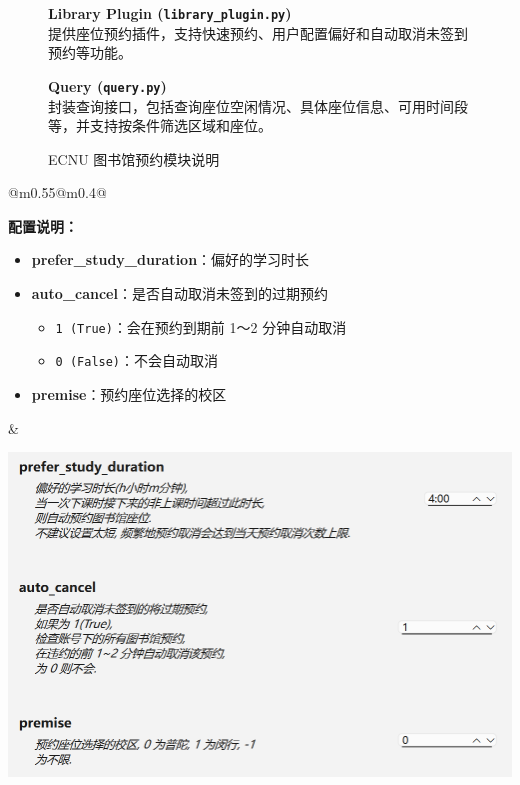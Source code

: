 \documentclass[14pt,a4paper,UTF8,twoside]{article}
\begin{document}
\begin{figure}[H]
{\begin{minipage}[H]{0.45\textwidth}
        \textbf{Library Plugin (\texttt{library\_plugin.py})}\\
        提供座位预约插件，支持快速预约、用户配置偏好和自动取消未签到预约等功能。\\
        \vspace{0.25cm}

        \textbf{Query (\texttt{query.py})}\\
        封装查询接口，包括查询座位空闲情况、具体座位信息、可用时间段等，并支持按条件筛选区域和座位。\\
    \end{minipage}
    }
    \caption{ECNU 图书馆预约模块说明}
    \label{fig:directory_structure}
\end{figure}

\newpage{}

\begin{table}[H]
    \centering
    \begin{tabular}{@{}m{0.55\textwidth}@{}m{0.4\textwidth}@{}}
        \begin{minipage}[H]{\linewidth}
            \textbf{配置说明：}
            \begin{itemize}[label=--]
                \item \textbf{prefer\_study\_duration}：偏好的学习时长
                \item \textbf{auto\_cancel}：是否自动取消未签到的过期预约
                \begin{itemize}
                    \item \texttt{1 (True)}：会在预约到期前 1～2 分钟自动取消
                    \item \texttt{0 (False)}：不会自动取消
                \end{itemize}
                \item \textbf{premise}：预约座位选择的校区
            \end{itemize}
        \end{minipage}
        &
        \begin{minipage}[H]{\linewidth}
            \centering
            \includegraphics[width=\linewidth]{img/library_plugin_config.png}

\end{minipage}
\end{tabular}
\end{table}
\end{document}

